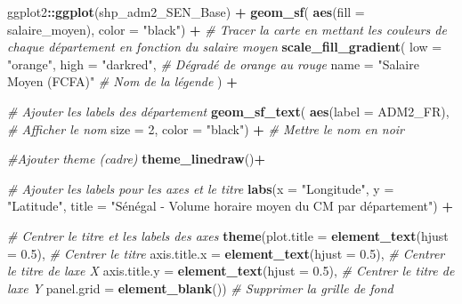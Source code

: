 \documentclass[
]{article}
\newenvironment{Shaded}{\begin{snugshade}}{\end{snugshade}}
\newcommand{\AttributeTok}[1]{\textcolor[rgb]{0.13,0.29,0.53}{#1}}
\newcommand{\CommentTok}[1]{\textcolor[rgb]{0.56,0.35,0.01}{\textit{#1}}}
\newcommand{\DecValTok}[1]{\textcolor[rgb]{0.00,0.00,0.81}{#1}}
\newcommand{\FloatTok}[1]{\textcolor[rgb]{0.00,0.00,0.81}{#1}}
\newcommand{\FunctionTok}[1]{\textcolor[rgb]{0.13,0.29,0.53}{\textbf{#1}}}
\newcommand{\NormalTok}[1]{#1}
\newcommand{\SpecialCharTok}[1]{\textcolor[rgb]{0.81,0.36,0.00}{\textbf{#1}}}
\newcommand{\StringTok}[1]{\textcolor[rgb]{0.31,0.60,0.02}{#1}}
\begin{document}
\begin{Shaded}
\begin{Highlighting}[]
\NormalTok{ggplot2}\SpecialCharTok{::}\FunctionTok{ggplot}\NormalTok{(shp\_adm2\_SEN\_Base) }\SpecialCharTok{+}
  \FunctionTok{geom\_sf}\NormalTok{( }\FunctionTok{aes}\NormalTok{(}\AttributeTok{fill =}\NormalTok{ salaire\_moyen), }\AttributeTok{color =} \StringTok{"black"}\NormalTok{) }\SpecialCharTok{+} \CommentTok{\# Tracer la carte en mettant les couleurs de chaque département en fonction du salaire moyen}
  \FunctionTok{scale\_fill\_gradient}\NormalTok{(}
    \AttributeTok{low =} \StringTok{"orange"}\NormalTok{, }\AttributeTok{high =} \StringTok{"darkred"}\NormalTok{,   }\CommentTok{\# Dégradé de orange au rouge}
    \AttributeTok{name =} \StringTok{"Salaire Moyen (FCFA)"}      \CommentTok{\# Nom de la légende}
\NormalTok{  ) }\SpecialCharTok{+}
  
  \CommentTok{\# Ajouter les labels des département}
  \FunctionTok{geom\_sf\_text}\NormalTok{( }
               \FunctionTok{aes}\NormalTok{(}\AttributeTok{label =}\NormalTok{ ADM2\_FR), }\CommentTok{\# Afficher le nom  }
               \AttributeTok{size =} \DecValTok{2}\NormalTok{, }\AttributeTok{color =} \StringTok{"black"}\NormalTok{) }\SpecialCharTok{+}  \CommentTok{\# Mettre le nom en noir}
  
  \CommentTok{\#Ajouter theme  (cadre)}
  \FunctionTok{theme\_linedraw}\NormalTok{()}\SpecialCharTok{+}
  
  \CommentTok{\# Ajouter les labels pour les axes et le titre}
  \FunctionTok{labs}\NormalTok{(}\AttributeTok{x =} \StringTok{"Longitude"}\NormalTok{, }\AttributeTok{y =} \StringTok{"Latitude"}\NormalTok{, }\AttributeTok{title =} \StringTok{"Sénégal {-} Volume horaire moyen du CM par département"}\NormalTok{) }\SpecialCharTok{+}  
  
  \CommentTok{\# Centrer le titre et les labels des axes}
  \FunctionTok{theme}\NormalTok{(}\AttributeTok{plot.title =} \FunctionTok{element\_text}\NormalTok{(}\AttributeTok{hjust =} \FloatTok{0.5}\NormalTok{),  }\CommentTok{\# Centrer le titre}
        \AttributeTok{axis.title.x =} \FunctionTok{element\_text}\NormalTok{(}\AttributeTok{hjust =} \FloatTok{0.5}\NormalTok{),  }\CommentTok{\# Centrer le titre de l\textquotesingle{}axe X}
        \AttributeTok{axis.title.y =} \FunctionTok{element\_text}\NormalTok{(}\AttributeTok{hjust =} \FloatTok{0.5}\NormalTok{),  }\CommentTok{\# Centrer le titre de l\textquotesingle{}axe Y}
        \AttributeTok{panel.grid =} \FunctionTok{element\_blank}\NormalTok{())  }\CommentTok{\# Supprimer la grille de fond}
\end{Highlighting}
\end{Shaded}
\end{document}
